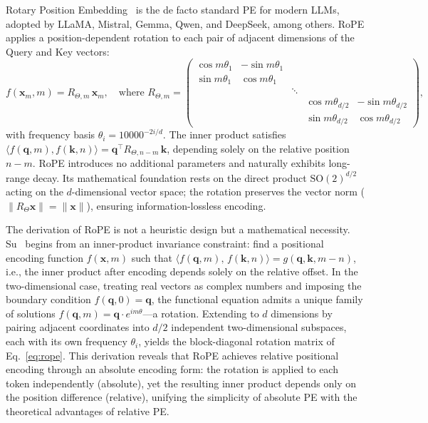 Rotary Position Embedding~\cite{su2024roformer} is the de facto standard PE for modern LLMs, adopted by LLaMA, Mistral, Gemma, Qwen, and DeepSeek, among others. RoPE applies a position-dependent rotation to each pair of adjacent dimensions of the Query and Key vectors:
\begin{equation}
  f(\mathbf{x}_m, m) = R_{\Theta,m}\,\mathbf{x}_m, \quad
  \text{where } R_{\Theta,m} = \begin{pmatrix}
    \cos m\theta_1 & -\sin m\theta_1 \\
    \sin m\theta_1 & \cos m\theta_1 \\
    & & \ddots \\
    & & & \cos m\theta_{d/2} & -\sin m\theta_{d/2} \\
    & & & \sin m\theta_{d/2} & \cos m\theta_{d/2}
  \end{pmatrix},
  \label{eq:rope}
\end{equation}
with frequency basis $\theta_i = 10000^{-2i/d}$. The inner product satisfies $\langle f(\mathbf{q},m), f(\mathbf{k},n)\rangle = \mathbf{q}^\top R_{\Theta,n-m}\,\mathbf{k}$, depending solely on the relative position $n-m$. RoPE introduces no additional parameters and naturally exhibits long-range decay. Its mathematical foundation rests on the direct product $\mathrm{SO}(2)^{d/2}$ acting on the $d$-dimensional vector space; the rotation preserves the vector norm ($\|R_\Theta \mathbf{x}\| = \|\mathbf{x}\|$), ensuring information-lossless encoding.

The derivation of RoPE is not a heuristic design but a mathematical necessity. Su~\cite{su2024roformer} begins from an inner-product invariance constraint: find a positional encoding function $f(\mathbf{x}, m)$ such that $\langle f(\mathbf{q}, m),\, f(\mathbf{k}, n) \rangle = g(\mathbf{q}, \mathbf{k}, m{-}n)$, i.e., the inner product after encoding depends solely on the relative offset. In the two-dimensional case, treating real vectors as complex numbers and imposing the boundary condition $f(\mathbf{q}, 0) = \mathbf{q}$, the functional equation admits a unique family of solutions $f(\mathbf{q}, m) = \mathbf{q} \cdot e^{im\theta}$---a rotation. Extending to $d$ dimensions by pairing adjacent coordinates into $d/2$ independent two-dimensional subspaces, each with its own frequency $\theta_i$, yields the block-diagonal rotation matrix of Eq.~\eqref{eq:rope}. This derivation reveals that RoPE achieves relative positional encoding through an absolute encoding form: the rotation is applied to each token independently (absolute), yet the resulting inner product depends only on the position difference (relative), unifying the simplicity of absolute PE with the theoretical advantages of relative PE.

